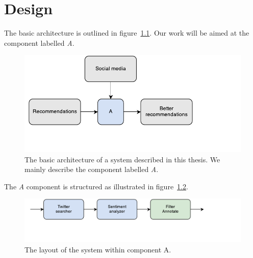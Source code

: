 
\chapter{Design} %

\label{Chapter3} %



% 
% 

The basic architecture is outlined in figure~\ref{fig:1_basic_architecture}. Our work will be aimed at the component labelled \emph{A}.

\begin{figure}[h]
  \centering
    \includegraphics{Figures/01-high-level-architecture}
  \caption{The basic architecture of a system described in this thesis. We mainly describe the component labelled \emph{A}.}
  \label{fig:1_basic_architecture}
\end{figure}

The \emph{A} component is structured as illustrated in figure~\ref{fig:2_component_architecture}.

\begin{figure}[h]
  \centering
    \includegraphics{Figures/02-component-layout}
  \caption{The layout of the system within component A.}
  \label{fig:2_component_architecture}
\end{figure}

